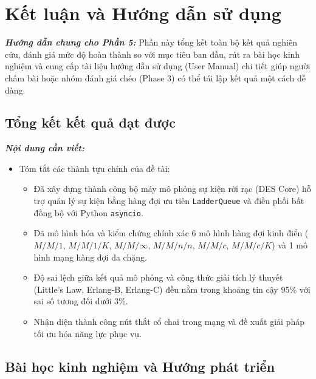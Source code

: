 \section{Kết luận và Hướng dẫn sử dụng}
\label{sec:ket-luan}

\textit{\textbf{Hướng dẫn chung cho Phần 5:}} Phần này tổng kết toàn bộ kết quả nghiên cứu, đánh giá mức độ hoàn thành so với mục tiêu ban đầu, rút ra bài học kinh nghiệm và cung cấp tài liệu hướng dẫn sử dụng (User Manual) chi tiết giúp người chấm bài hoặc nhóm đánh giá chéo (Phase 3) có thể tái lập kết quả một cách dễ dàng.

\subsection{Tổng kết kết quả đạt được}
\label{subsec:tong-ket}
\textit{\textbf{Nội dung cần viết:}}
\begin{itemize}[leftmargin=1.5em]
    \item Tóm tắt các thành tựu chính của đề tài:
    \begin{itemize}
        \item Đã xây dựng thành công bộ máy mô phỏng sự kiện rời rạc (DES Core) hỗ trợ quản lý sự kiện bằng hàng đợi ưu tiên \texttt{LadderQueue} và điều phối bất đồng bộ với Python \texttt{asyncio}.
        \item Đã mô hình hóa và kiểm chứng chính xác 6 mô hình hàng đợi kinh điển ($M/M/1$, $M/M/1/K$, $M/M/\infty$, $M/M/n/n$, $M/M/c$, $M/M/c/K$) và 1 mô hình mạng hàng đợi đa chặng.
        \item Độ sai lệch giữa kết quả mô phỏng và công thức giải tích lý thuyết (Little's Law, Erlang-B, Erlang-C) đều nằm trong khoảng tin cậy 95\% với sai số tương đối dưới 3\%.
        \item Nhận diện thành công nút thắt cổ chai trong mạng và đề xuất giải pháp tối ưu hóa năng lực phục vụ.
    \end{itemize}
\end{itemize}

\subsection{Bài học kinh nghiệm và Hướng phát triển}
\label{subsec:bai-hoc-phat-trien}

